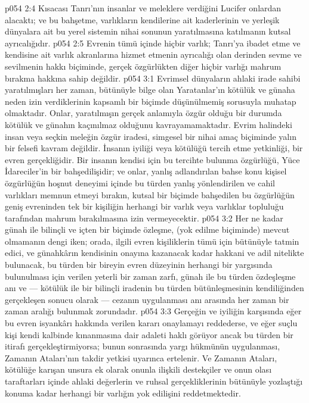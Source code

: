 \vs p054 2:4 Kısacası Tanrı’nın insanlar ve meleklere verdiğini Lucifer onlardan alacaktı; ve bu bahşetme, varlıkların kendilerine ait kaderlerinin ve yerleşik dünyalara ait bu yerel sistemin nihai sonunun yaratılmasına katılmanın kutsal ayrıcalığıdır.
\vs p054 2:5 Evrenin tümü içinde hiçbir varlık; Tanrı’ya ibadet etme ve kendisine ait varlık akranlarına hizmet etmenin ayrıcalığı olan derinden sevme ve sevilmenin hakkı biçiminde, gerçek özgürlükten diğer hiçbir varlığı mahrum bırakma hakkına sahip değildir.
\vs p054 3:1 Evrimsel dünyaların ahlaki irade sahibi yaratılmışları her zaman, bütünüyle bilge olan Yaratanlar’ın kötülük ve günaha neden izin verdiklerinin kapsamlı bir biçimde düşünülmemiş sorusuyla muhatap olmaktadır. Onlar, yaratılmışın gerçek anlamıyla özgür olduğu bir durumda kötülük ve günahın kaçınılmaz olduğunu kavrayamamaktadır. Evrim halindeki insan veya seçkin meleğin özgür iradesi, simgesel bir nihai amaç biçiminde yalın bir felsefi kavram değildir. İnsanın iyiliği veya kötülüğü tercih etme yetkinliği, bir evren gerçekliğidir. Bir insanın kendisi için bu tercihte bulunma özgürlüğü, Yüce İdareciler’in bir bahşedilişidir; ve onlar, yanlış adlandırılan bahse konu kişisel özgürlüğün hoşnut deneyimi içinde bu türden yanlış yönlendirilen ve cahil varlıkları memnun etmeyi bırakın, kutsal bir biçimde bahşedilen bu özgürlüğün geniş evreninden tek bir kişiliğin herhangi bir varlık veya varlıklar topluluğu tarafından mahrum bırakılmasına izin vermeyecektir.
\vs p054 3:2 Her ne kadar günah ile bilinçli ve içten bir biçimde özleşme, (yok edilme biçiminde) mevcut olmamanın dengi iken; orada, ilgili evren kişiliklerin tümü için bütünüyle tatmin edici, ve günahkârın kendisinin onayına kazanacak kadar hakkani ve adil nitelikte bulunacak, bu türden bir bireyin evren düzeyinin herhangi bir yargısında bulunulması için verilen yeterli bir zaman zarfı, günah ile bu türden özdeşleşme anı ve --- kötülük ile bir bilinçli iradenin bu türden bütünleşmesinin kendiliğinden gerçekleşen sonucu olarak --- cezanın uygulanması anı arasında her zaman bir zaman aralığı bulunmak zorundadır.
\vs p054 3:3 Gerçeğin ve iyiliğin karşısında eğer bu evren isyankârı hakkında verilen kararı onaylamayı reddederse, ve eğer suçlu kişi kendi kalbinde kınanmasına dair adaleti haklı görüyor ancak bu türden bir itirafı gerçekleştirmiyorsa; bunun sonrasında yargı hükmünün uygulanması, Zamanın Ataları’nın takdir yetkisi uyarınca ertelenir. Ve Zamanın Ataları, kötülüğe karışan unsura ek olarak onunla ilişkili destekçiler ve onun olası taraftarları içinde ahlaki değerlerin ve ruhsal gerçekliklerinin bütünüyle yozlaştığı konuma kadar herhangi bir varlığın yok edilişini reddetmektedir.
